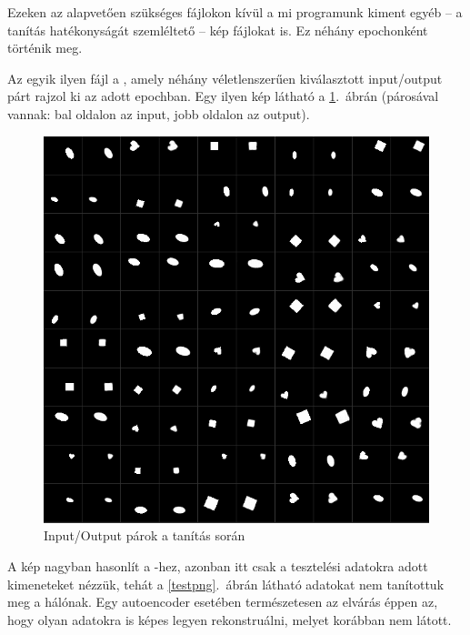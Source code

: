Ezeken az alapvetően szükséges fájlokon kívül a mi programunk kiment egyéb -- a tanítás hatékonyságát szemléltető -- kép fájlokat is. Ez néhány epochonként történik meg.

Az egyik ilyen fájl a , amely néhány véletlenszerűen kiválasztott input/output párt rajzol ki az adott epochban. Egy ilyen kép látható a \ref{trainpng}.~ábrán (párosával vannak: bal oldalon az input, jobb oldalon az output).

\begin{figure}[h!]
\begin{center}
  
  
	\begin{center}
	\includegraphics[width=0.75\linewidth]{trainpng.png}
	\end{center}
	
  \caption{Input/Output párok a tanítás során}\label{trainpng}
\end{center}
\end{figure}

A  kép nagyban hasonlít a -hez, azonban itt csak a tesztelési adatokra adott kimeneteket nézzük, tehát a \ref{testpng}.~ábrán látható adatokat nem tanítottuk meg a hálónak. Egy autoencoder esetében természetesen az elvárás éppen az, hogy olyan adatokra is képes legyen rekonstruálni, melyet korábban nem látott.

